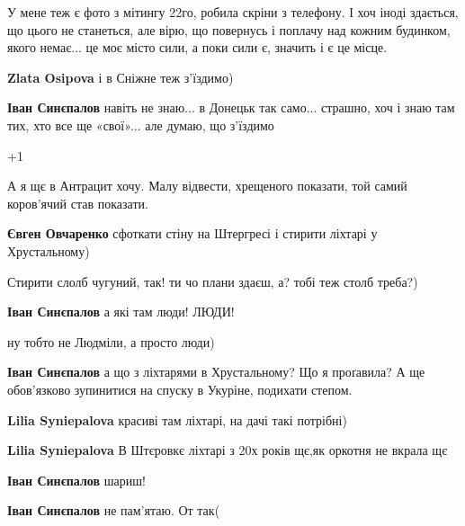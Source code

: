  
 
 
 
 

\qqSecCmt


У мене теж є фото з мітингу 22го, робила скріни з телефону. І хоч іноді
здається, що цього не станеться, але вірю, що повернусь і поплачу над кожним
будинком, якого немає... це моє місто сили, а поки сили є, значить і є це місце.

\begin{itemize} %
\textbf{Zlata Osipova} і в Сніжне теж з'їздимо)

\textbf{Іван Синєпалов} навіть не знаю... в Донецьк так само... страшно, хоч і знаю там тих, хто все ще «свої»... але думаю, що з'їздимо 💙💛
\end{itemize} %


+1


А я щє в Антрацит хочу. Малу відвести, хрещеного показати, той самий коров'ячий став показати.

\begin{itemize} %
\textbf{Євген Овчаренко} сфоткати стіну на Штергресі і стирити ліхтарі у Хрустальному)


Стирити слолб чугуний, так! ти чо плани здаєш, а? тобі теж столб треба?)

\textbf{Іван Синєпалов} а які там люди! ЛЮДИ!


ну тобто не Людміли, а просто люди)

\textbf{Іван Синєпалов} а що з ліхтарями в Хрустальному? Що я проґавила?
А ще обов'язково зупинитися на спуску в Укуріне, подихати степом.

\textbf{Lilia Syniepalova} красиві там ліхтарі, на дачі такі потрібні)

\textbf{Lilia Syniepalova} В Штєровкє ліхтарі з 20х років щє,як оркотня не вкрала щє

\textbf{Іван Синєпалов} шариш!

\textbf{Іван Синєпалов} не пам'ятаю. От так(
\end{itemize} %


